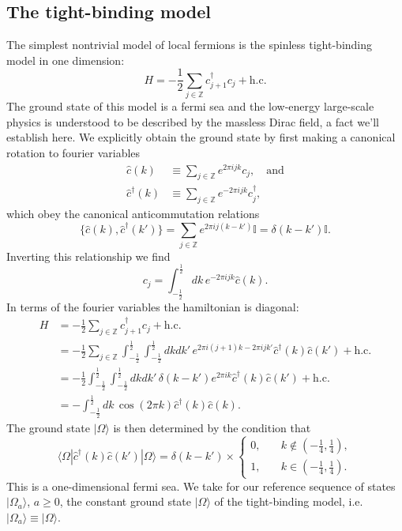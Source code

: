 \documentclass[prl,twocolumn,lengthcheck,superscriptaddress]{revtex4-1}
\theoremstyle{definition}
\theoremstyle{remark}
\begin{document}
\subsection{The tight-binding model}
The simplest nontrivial model of local fermions is the spinless tight-binding model in one dimension:
\begin{equation}
	H = -\frac12\sum_{j\in \mathbb{Z}} c_{j+1}^\dag c_j + \text{h.c.}
\end{equation}
The ground state of this model is a fermi sea and the low-energy large-scale physics is understood to be described by the massless Dirac field, a fact we'll establish here. We explicitly obtain the ground state by first making a canonical rotation to fourier variables
\begin{equation}
	\begin{split}
		\widehat{c}(k) &\equiv \sum_{j\in\mathbb{Z}} e^{2\pi i jk} c_j, \quad \text{and} \\
		\widehat{c}^\dag(k) &\equiv \sum_{j\in\mathbb{Z}} e^{-2\pi i jk} c_j^\dag,
	\end{split}
\end{equation}
which obey the canonical anticommutation relations
\begin{equation}
	\{\widehat{c}(k), \widehat{c}^\dag(k')\} = \sum_{j\in\mathbb{Z}} e^{2\pi i j(k-k')}\mathbb{I} = \delta(k-k')\mathbb{I}.
\end{equation}
Inverting this relationship we find 
\begin{equation}
	c_j = \int_{-\frac12}^{\frac12} dk\, e^{-2\pi ijk} \widehat{c}(k).
\end{equation}
In terms of the fourier variables the hamiltonian is diagonal:
\begin{equation}
	\begin{split}
		H &= -\frac12\sum_{j\in \mathbb{Z}} c_{j+1}^\dag c_j + \text{h.c.} \\
		&= -\frac12\sum_{j\in \mathbb{Z}}\int_{-\frac12}^\frac12 \int_{-\frac12}^\frac12 dkdk'\, e^{2\pi i (j+1)k- 2\pi i j k'} \widehat{c}^\dag(k) \widehat{c}(k') + \text{h.c.} \\ 
		&= -\frac12\int_{-\frac12}^\frac12 \int_{-\frac12}^\frac12 dkdk'\, \delta(k-k') e^{2\pi i k} \widehat{c}^\dag(k) \widehat{c}(k') + \text{h.c.} \\ 
		&= -\int_{-\frac12}^\frac12 dk\, \cos(2\pi k) \widehat{c}^\dag(k) \widehat{c}(k).
	\end{split}
\end{equation}
The ground state $|\Omega\rangle$ is then determined by the condition that 
\begin{equation}
\langle \Omega|\widehat{c}^\dag(k) \widehat{c}(k')|\Omega\rangle = \delta(k-k')\times \begin{cases}
	0, &\quad k \not\in (-\frac14, \frac14), \\
	1, &\quad k \in (-\frac14, \frac14).
\end{cases}
\end{equation}
This is a one-dimensional fermi sea. We take for our reference sequence of states $|\Omega_a\rangle$, $a\ge 0$, the constant ground state $|\Omega\rangle$ of the tight-binding model, i.e.\ $|\Omega_a\rangle \equiv |\Omega\rangle$.
\end{document}
